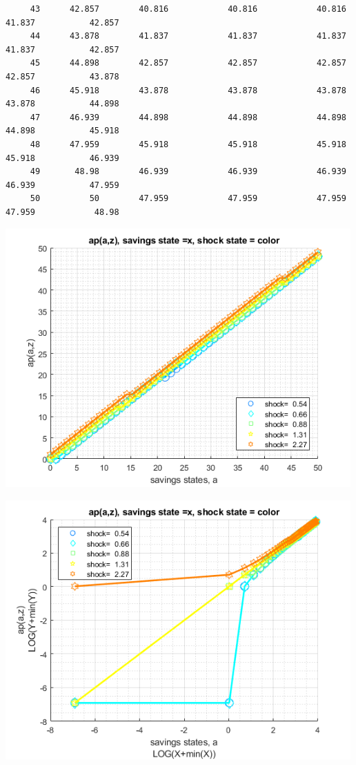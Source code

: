 \documentclass[
]{book}
\begin{document}
\begin{verbatim}
     43      42.857        40.816            40.816            40.816           41.837           42.857    
     44      43.878        41.837            41.837            41.837           41.837           42.857    
     45      44.898        42.857            42.857            42.857           42.857           43.878    
     46      45.918        43.878            43.878            43.878           43.878           44.898    
     47      46.939        44.898            44.898            44.898           44.898           45.918    
     48      47.959        45.918            45.918            45.918           45.918           46.939    
     49       48.98        46.939            46.939            46.939           46.939           47.959    
     50          50        47.959            47.959            47.959           47.959            48.98    
\end{verbatim}

\includegraphics[width=5.20833in,height=\textheight]{img/fx_vfi_az_loop_images/figure_0.png}

\includegraphics[width=5.20833in,height=\textheight]{img/fx_vfi_az_loop_images/figure_1.png}
\end{document}
